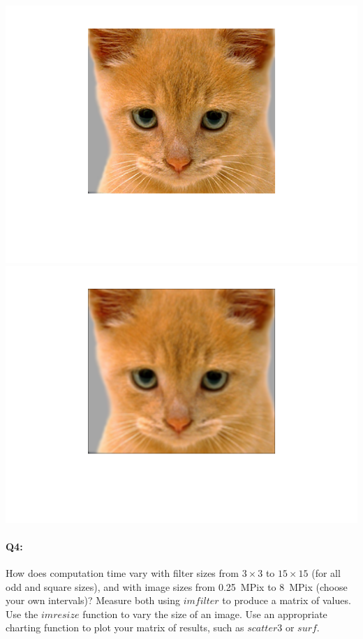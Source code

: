 	\includegraphics[scale=0.35]{fig1}  \includegraphics[scale=0.35]{fig2}
	


	
	
	
	
	\pagebreak
	\paragraph{Q4:} How does computation time vary with filter sizes from $3\times3$ to $15\times15$ (for all odd and square sizes), and with image sizes from 0.25~MPix to 8~MPix (choose your own intervals)? Measure both using \href{https://www.mathworks.com/help/images/ref/imfilter.html}{$imfilter$} to produce a matrix of values. Use the \href{https://www.mathworks.com/help/images/ref/imresize.html}{$imresize$} function to vary the size of an image. Use an appropriate charting function to plot your matrix of results, such as \href{https://www.mathworks.com/help/matlab/ref/scatter3.html}{$scatter3$} or \href{https://www.mathworks.com/help/matlab/ref/surf.html}{$surf$}.
	
